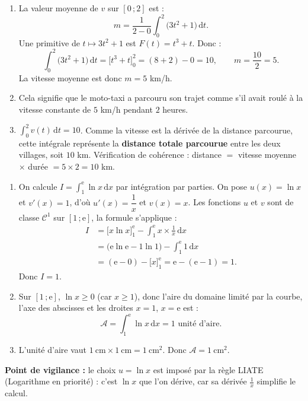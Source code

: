 \documentclass[11pt]{article}
\begin{document}
\begin{corrige}
\begin{enumerate}
\item La valeur moyenne de $v$ sur $[0\,;2]$ est :
\[ m = \frac{1}{2-0}\int_0^2 \big(3t^2+1\big)\,\mathrm{d}t. \]
Une primitive de $t\mapsto 3t^2+1$ est $F(t)=t^3+t$. Donc :
\[ \int_0^2 \big(3t^2+1\big)\,\mathrm{d}t = \Big[t^3+t\Big]_0^2 = (8+2)-0 = 10, \qquad m = \frac{10}{2} = 5. \]
La vitesse moyenne est donc $m = 5$ km/h.
\item Cela signifie que le moto-taxi a parcouru son trajet comme s'il avait roulé à la vitesse constante de $5$ km/h pendant $2$ heures.
\item $\displaystyle\int_0^2 v(t)\,\mathrm{d}t = 10$. Comme la vitesse est la dérivée de la distance parcourue, cette intégrale représente la \textbf{distance totale parcourue} entre les deux villages, soit $10$ km. Vérification de cohérence : distance $=$ vitesse moyenne $\times$ durée $= 5\times 2 = 10$ km.
\end{enumerate}
\end{corrige}

\begin{corrige}
\begin{enumerate}
\item On calcule $I = \displaystyle\int_1^{\mathrm{e}} \ln x\,\mathrm{d}x$ par intégration par parties.
On pose $u(x)=\ln x$ et $v'(x)=1$, d'où $u'(x)=\dfrac{1}{x}$ et $v(x)=x$.
Les fonctions $u$ et $v$ sont de classe $\mathcal{C}^1$ sur $[1\,;\mathrm{e}]$, la formule s'applique :
\begin{align*}
I &= \Big[x\ln x\Big]_1^{\mathrm{e}} - \int_1^{\mathrm{e}} x\times\frac{1}{x}\,\mathrm{d}x \\
&= \big(\mathrm{e}\ln\mathrm{e} - 1\ln 1\big) - \int_1^{\mathrm{e}} 1\,\mathrm{d}x \\
&= (\mathrm{e}-0) - \Big[x\Big]_1^{\mathrm{e}} = \mathrm{e}-(\mathrm{e}-1) = 1.
\end{align*}
Donc $I = 1$.
\item Sur $[1\,;\mathrm{e}]$, $\ln x \geq 0$ (car $x\geq 1$), donc l'aire du domaine limité par la courbe, l'axe des abscisses et les droites $x=1$, $x=\mathrm{e}$ est :
\[ \mathcal{A} = \int_1^{\mathrm{e}} \ln x\,\mathrm{d}x = 1 \text{ unité d'aire.} \]
\item L'unité d'aire vaut $1\ \mathrm{cm}\times 1\ \mathrm{cm} = 1\ \mathrm{cm}^2$. Donc $\mathcal{A} = 1\ \mathrm{cm}^2$.
\end{enumerate}
\textbf{Point de vigilance :} le choix $u=\ln x$ est imposé par la règle LIATE (Logarithme en priorité) : c'est $\ln x$ que l'on dérive, car sa dérivée $\frac{1}{x}$ simplifie le calcul.
\end{corrige}
\end{document}
